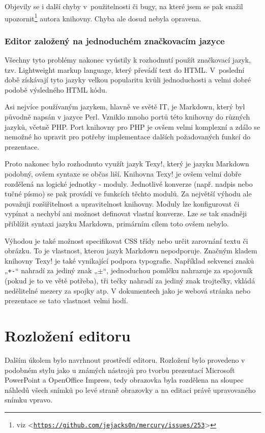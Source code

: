 \documentclass[11pt,twoside,a4paper]{book}
\let\oldUrl\url									%
\renewcommand\url[1]{<\texttt{\oldUrl{#1}}>}
\begin{document}
Objevily se i další chyby v~použitelnosti či bugy, na které jsem se pak snažil upozornit\footnote{viz \url{https://github.com/jejacks0n/mercury/issues/253}} autora knihovny. Chyba ale dosud nebyla opravena.

\subsubsection{Editor založený na jednoduchém značkovacím jazyce}
Všechny tyto problémy nakonec vyústily k rozhodnutí použít značkovací jazyk, tzv. Lightweight markup language, který
převádí text do HTML. V~poslední době získávají tyto jazyky velkou popularitu kvůli jednoduchosti a velmi dobré podobě
výsledného HTML kódu.

Asi nejvíce používaným jazykem, hlavně ve světě IT, je Markdown\cite{markdown}, který byl původně napsán v jazyce Perl. Vzniklo mnoho portů této knihovny do různých jazyků, včetně PHP. Port knihovny pro PHP je ovšem velmi komplexní a zdálo se nemožné ho upravit pro potřeby implementace dalších požadovaných funkcí do prezentace.

Proto nakonec bylo rozhodnuto využít jazyk Texy!\cite{texy}, který je jazyku Markdown podobný, ovšem syntaxe se občas liší. Knihovna Texy! je ovšem velmi dobře rozdělená na logické jednotky - moduly. Jednotlivé konverze (např. nadpis nebo tučné písmo) se pak provádí ve funkcích těchto modulů. Za největší výhodu ale považuji rozšiřitelnost a upravitelnost knihovny. Moduly lze konfigurovat či vypínat a nechybí ani možnost definovat vlastní konverze. Lze se tak snadněji přiblížit syntaxi jazyku Markdown, primárním cílem toto ovšem nebylo.

Výhodou je také možnost specifikovat CSS třídy nebo určit zarovnání textu či obrázku. To je vlastnost, kterou jazyk Markdown nepodporuje. Značným kladem knihovny Texy! je také vynikající podpora typografie. Například sekvenci znaků „\lstinline|+-|“ nahradí za jediný znak „$\pm$“, jednoduchou pomlčku nahrazuje za spojovník (pokud je to ve větě potřeba), tři tečky nahradí za jediný znak trojtečky, vkládá nedělitelné mezery za spojky atp. V dokumentech jako je webová stránka nebo prezentace se tato vlastnost velmi hodí.


\section{Rozložení editoru}
Dalším úkolem bylo navrhnout prostředí editoru. Rozložení bylo provedeno v podobném stylu jako u známých nástrojů pro tvorbu prezentací Microsoft PowerPoint a OpenOffice Impress, tedy obrazovka byla rozdělena na sloupec náhledů všech snímků po levé straně obrazovky a na editaci právě upravovaného snímku vpravo.
\end{document}
